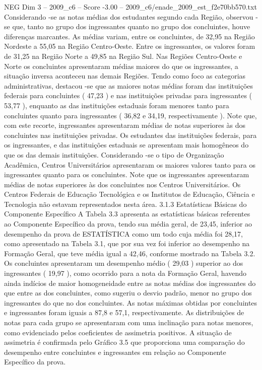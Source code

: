 \begin{textsample}{NEG Dim 3 – 2009\_c6 – Score -3.00 – 2009\_c6/enade\_2009\_est\_f2e70bb570.txt}
Considerando -se as notas médias dos estudantes segundo cada Região, observou -se que, tanto no grupo dos ingressantes quanto no grupo dos concluintes, houve diferenças marcantes.
As médias variam, entre os concluintes, de 32,95 na Região Nordeste a 55,05 na Região Centro-Oeste.
Entre os ingressantes, os valores foram de 31,25 na Região Norte a 49,85 na Região Sul.
Nas Regiões Centro-Oeste e Norte os concluintes apresentaram médias maiores do que os ingressantes, a situação inversa aconteceu nas demais Regiões.
Tendo como foco as categorias administrativas, destacou -se que as maiores notas médias foram das instituições federais para concluintes ( 47,23 ) e nas instituições privadas para ingressantes ( 53,77 ), enquanto as das instituições estaduais foram menores tanto para concluintes quanto para ingressantes ( 36,82 e 34,19, respectivamente ).
Note que, com este recorte, ingressantes apresentaram médias de notas superiores às dos concluintes nas instituições privadas.
Os estudantes das instituições federais, para os ingressantes, e das instituições estaduais se apresentam mais homogêneos do que os das demais instituições.
Considerando -se o tipo de Organização Acadêmica, Centros Universitários apresentaram os maiores valores tanto para os ingressantes quanto para os concluintes.
Note que os ingressantes apresentaram médias de notas superiores às dos concluintes nos Centros Universitários.
Os Centros Federais de Educação Tecnológica e os Institutos de Educação, Ciência e Tecnologia não estavam representados nesta área. 3.1.3 Estatísticas Básicas do Componente Específico A Tabela 3.3 apresenta as estatísticas básicas referentes ao Componente Específico da prova, tendo sua média geral, de 23,45, inferior ao desempenho da prova de ESTATÍSTICA como um todo cuja média foi 28,17, como apresentado na Tabela 3.1, que por sua vez foi inferior ao desempenho na Formação Geral, que teve média igual a 42,46, conforme mostrado na Tabela 3.2.
Os concluintes apresentaram um desempenho médio ( 29,03 ) superior ao dos ingressantes ( 19,97 ), como ocorrido para a nota da Formação Geral, havendo ainda indícios de maior homogeneidade entre as notas médias dos ingressantes do que entre as dos concluintes, como sugeriu o desvio padrão, menor no grupo dos ingressantes do que no dos concluintes.
As notas máximas obtidas por concluintes e ingressantes foram iguais a 87,8 e 57,1, respectivamente.
As distribuições de notas para cada grupo se apresentaram com uma inclinação para notas menores, como evidenciado pelos coeficientes de assimetria positivos.
A situação de assimetria é confirmada pelo Gráfico 3.5 que proporciona uma comparação do desempenho entre concluintes e ingressantes em relação ao Componente Específico da prova.

\end{textsample}
